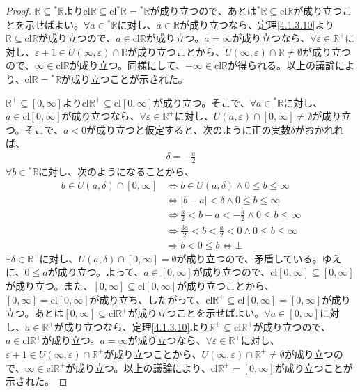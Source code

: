 \documentclass[dvipdfmx]{jsarticle}
\begin{document}
\begin{proof}
$\mathbb{R} \subseteq{}^{*}\mathbb{R}$より$\mathrm{cl}\mathbb{R} \subseteq \mathrm{cl}{{}^{*}\mathbb{R}} ={}^{*}\mathbb{R}$が成り立つので、あとは${}^{*}\mathbb{R} \subseteq \mathrm{cl}\mathbb{R}$が成り立つことを示せばよい。$\forall a \in{}^{*}\mathbb{R}$に対し、$a \in \mathbb{R}$が成り立つなら、定理\ref{4.1.3.10}より$\mathbb{R} \subseteq \mathrm{cl}\mathbb{R}$が成り立つので、$a \in \mathrm{cl}\mathbb{R}$が成り立つ。$a = \infty$が成り立つなら、$\forall\varepsilon \in \mathbb{R}^{+}$に対し、$\varepsilon + 1 \in U(\infty,\varepsilon) \cap \mathbb{R}$が成り立つことから、$U(\infty,\varepsilon) \cap \mathbb{R} \neq \emptyset$が成り立つので、$\infty \in \mathrm{cl}\mathbb{R}$が成り立つ。同様にして、$- \infty \in \mathrm{cl}\mathbb{R}$が得られる。以上の議論により、$\mathrm{cl}\mathbb{R} ={}^{*}\mathbb{R}$が成り立つことが示された。\par
$\mathbb{R}^{+} \subseteq [ 0,\infty]$より$\mathrm{cl}\mathbb{R}^{+} \subseteq \mathrm{cl}[ 0,\infty]$が成り立つ。そこで、$\forall a \in{}^{*}\mathbb{R}$に対し、$a \in \mathrm{cl}[ 0,\infty]$が成り立つなら、$\forall\varepsilon \in \mathbb{R}^{+}$に対し、$U(a,\varepsilon) \cap [ 0,\infty] \neq \emptyset$が成り立つ。そこで、$a < 0$が成り立つと仮定すると、次のように正の実数$\delta$がおかれれば、
\begin{align*}
\delta = - \frac{a}{2}
\end{align*}
$\forall b \in{}^{*}\mathbb{R}$に対し、次のようになることから、
\begin{align*}
b \in U(a,\delta) \cap [ 0,\infty] &\Leftrightarrow b \in U(a,\delta) \land 0 \leq b \leq \infty\\
&\Leftrightarrow |b - a| < \delta \land 0 \leq b \leq \infty\\
&\Leftrightarrow \frac{a}{2} < b - a < - \frac{a}{2} \land 0 \leq b \leq \infty\\
&\Leftrightarrow \frac{3a}{2} < b < \frac{a}{2} < 0 \land 0 \leq b \leq \infty\\
&\Rightarrow b < 0 \leq b \Leftrightarrow \bot
\end{align*}
$\exists\delta \in \mathbb{R}^{+}$に対し、$U(a,\delta) \cap [ 0,\infty] = \emptyset$が成り立つので、矛盾している。ゆえに、$0 \leq a$が成り立つ。よって、$a \in [ 0,\infty]$が成り立つので、$\mathrm{cl}[ 0,\infty] \subseteq [ 0,\infty]$が成り立つ。また、$[ 0,\infty] \subseteq \mathrm{cl}[ 0,\infty]$が成り立つことから、$[ 0,\infty] = \mathrm{cl}[ 0,\infty]$が成り立ち、したがって、$\mathrm{cl}\mathbb{R}^{+} \subseteq \mathrm{cl}[ 0,\infty] = [ 0,\infty]$が成り立つ。あとは$[ 0,\infty] \subseteq \mathrm{cl}\mathbb{R}^{+}$が成り立つことを示せばよい。$\forall a \in [ 0,\infty]$に対し、$a \in \mathbb{R}^{+}$が成り立つなら、定理\ref{4.1.3.10}より$\mathbb{R}^{+} \subseteq \mathrm{cl}\mathbb{R}^{+}$が成り立つので、$a \in \mathrm{cl}\mathbb{R}^{+}$が成り立つ。$a = \infty$が成り立つなら、$\forall\varepsilon \in \mathbb{R}^{+}$に対し、$\varepsilon + 1 \in U(\infty,\varepsilon) \cap \mathbb{R}^{+}$が成り立つことから、$U(\infty,\varepsilon) \cap \mathbb{R}^{+} \neq \emptyset$が成り立つので、$\infty \in \mathrm{cl}\mathbb{R}^{+}$が成り立つ。以上の議論により、$\mathrm{cl}\mathbb{R}^{+} = [ 0,\infty]$が成り立つことが示された。
\end{proof}
\end{document}
